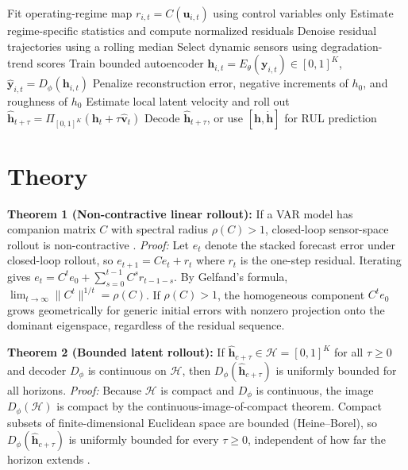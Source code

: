 \documentclass[letterpaper]{article}
\begin{document}
\begin{algorithm}[t]
\caption{Bounded Latent Degradation Manifold Learning}
\label{alg:manifold}
Fit operating-regime map $r_{i,t}=C(\mathbf{u}_{i,t})$ using control variables only\;
Estimate regime-specific statistics and compute normalized residuals\;
Denoise residual trajectories using a rolling median\;
Select dynamic sensors using degradation-trend scores\;
Train bounded autoencoder $\mathbf{h}_{i,t}=E_\theta(\mathbf{y}_{i,t})\in[0,1]^K$, $\hat{\mathbf{y}}_{i,t}=D_\phi(\mathbf{h}_{i,t})$\;
Penalize reconstruction error, negative increments of $h_0$, and roughness of $h_0$\;
Estimate local latent velocity and roll out $\hat{\mathbf{h}}_{t+\tau}=\Pi_{[0,1]^K}(\mathbf{h}_t+\tau\hat{\mathbf{v}}_t)$\;
Decode $\hat{\mathbf{h}}_{t+\tau}$, or use $[\mathbf{h},\dot{\mathbf{h}}]$ for RUL prediction\;
\end{algorithm}

\section{Theory}

\textbf{Theorem 1 (Non-contractive linear rollout):} If a VAR model has companion matrix $C$ with spectral radius $\rho(C) > 1$, closed-loop sensor-space rollout is non-contractive \cite{hamilton1994time,lutkepohl2005new}. \textit{Proof:} Let $e_t$ denote the stacked forecast error under closed-loop rollout, so $e_{t+1}=Ce_t+r_t$ where $r_t$ is the one-step residual. Iterating gives $e_t=C^te_0+\sum_{s=0}^{t-1}C^sr_{t-1-s}$. By Gelfand's formula, $\lim_{t\to\infty}\|C^t\|^{1/t}=\rho(C)$. If $\rho(C)>1$, the homogeneous component $C^te_0$ grows geometrically for generic initial errors with nonzero projection onto the dominant eigenspace, regardless of the residual sequence.

\textbf{Theorem 2 (Bounded latent rollout):} If $\hat{\mathbf{h}}_{c+\tau} \in \mathcal{H} = [0,1]^K$ for all $\tau \geq 0$ and decoder $D_\phi$ is continuous on $\mathcal{H}$, then $D_\phi(\hat{\mathbf{h}}_{c+\tau})$ is uniformly bounded for all horizons. \textit{Proof:} Because $\mathcal{H}$ is compact and $D_\phi$ is continuous, the image $D_\phi(\mathcal{H})$ is compact by the continuous-image-of-compact theorem. Compact subsets of finite-dimensional Euclidean space are bounded (Heine--Borel), so $D_\phi(\hat{\mathbf{h}}_{c+\tau})$ is uniformly bounded for every $\tau\geq0$, independent of how far the horizon extends \cite{munkres2000topology}.
\end{document}

